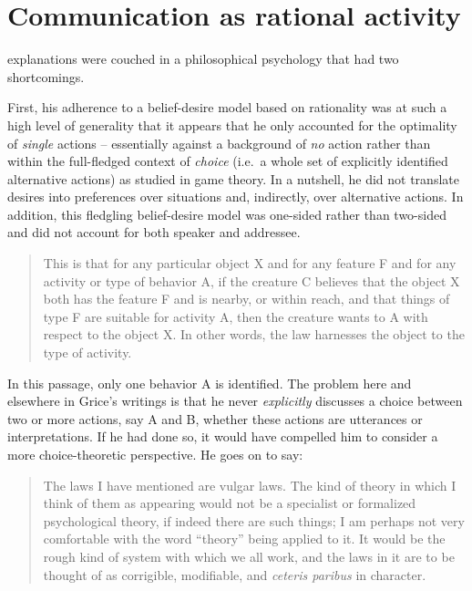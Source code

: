 \section{Communication as rational activity} \label{sec:communication as rational activity}

 explanations were couched in a philosophical psychology that had two shortcomings. 

First, his adherence to a belief-desire model based on rationality was at such a high level of generality that it appears that he only accounted for the optimality of \emph{single} actions -- essentially against a background of \emph{no} action rather than within the full-fledged context of \emph{choice} (i.e.\ a whole set of explicitly identified alternative actions) as studied in game theory. In a nutshell, he did not translate desires into preferences over situations and, indirectly, over alternative actions. In addition, this fledgling belief-desire model was one-sided rather than two-sided and did not account for both speaker and addressee.

\begin{quote}

This is that for any particular object X and for any feature F and for any activity or type of behavior A, if the creature C believes that the object X both has the feature F and is nearby, or within reach, and that things of type F are suitable for activity A, then the creature wants to A with respect to the object X. In other words, the law harnesses the object to the type of activity. \citep[285]{grice:mr}

\end{quote}

In this passage, only one behavior A is identified. The problem here and elsewhere in Grice's writings is that he never \emph{explicitly} discusses a choice between two or more actions, say A and B, whether these actions are utterances or interpretations. If he had done so, it would have compelled him to consider a more choice-theoretic perspective. He goes on to say:

\begin{quote}

The laws I have mentioned are vulgar laws. The kind of theory in which I think of them as appearing would not be a specialist or formalized psychological theory, if indeed there are such things; I am perhaps not very comfortable with the word ``theory'' being applied to it. It would be the rough kind of system with which we all work, and the laws in it are to be thought of as corrigible, modifiable, and \emph{ceteris paribus} in character. \citep[285]{grice:mr}

\end{quote}

